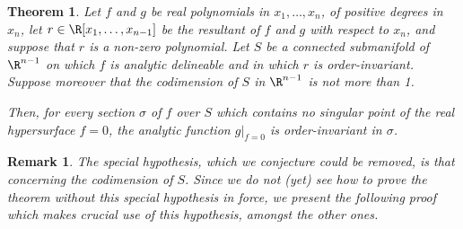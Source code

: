 \documentclass{article}
\newtheorem{theorem}{Theorem}
\newtheorem{remark}{Remark}
\begin{document}
\begin{theorem} \label{Variation of main lemma from M 1999}
    Let $f$ and $g$ be real polynomials in $x_1, \ldots, x_n$,
    of positive degrees in $x_n$, let $r \in \R[x_1, \ldots, x_{n-1}]$
    be the resultant of $f$ and $g$ with respect to $x_n$,
    and suppose that $r$ is a non-zero polynomial.
    Let $S$ be a connected submanifold of $\R^{n-1}$ on which
    $f$ is analytic delineable and in which $r$ is order-invariant.
    Suppose moreover that the codimension of $S$ in $\R^{n-1}$
    is not more than 1.
    
    Then, for every section $\sigma$ of $f$ over $S$ which contains
    no singular point of the real hypersurface $f = 0$,
    the analytic function $g|_{f=0}$ is order-invariant in $\sigma$.
\end{theorem}

\begin{remark} \label{Special hypothesis}
    The special hypothesis, which we conjecture could be removed, is 
    that 
    concerning the codimension of $S$. Since we do not (yet) see how to 
    prove the theorem without this special hypothesis in force, we
    present the following proof which makes crucial use of this 
    hypothesis, amongst the other ones.
\end{remark}
\end{document}
